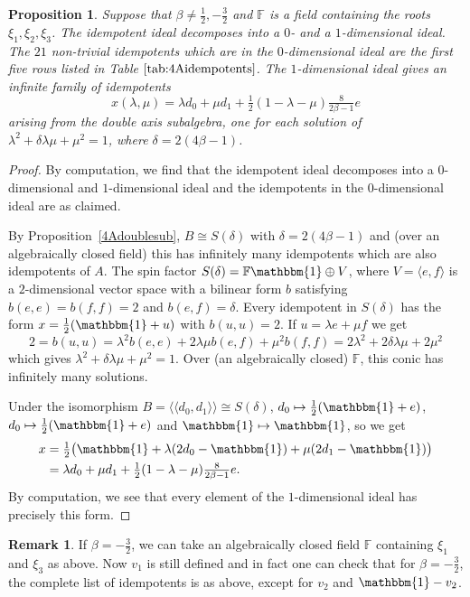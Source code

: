 \documentclass[11pt, a4paper]{article}
\theoremstyle{plain}
\newtheorem{proposition}[theorem]{Proposition}
\theoremstyle{definition}
\newtheorem{remark}[theorem]{Remark}
\newcommand\bt{\beta}
\newcommand\dl{\delta}
\newcommand\lm{\lambda}
\newcommand\la{\langle}
\newcommand\ra{\rangle}
\newcommand\lla{\langle\!\langle}
\newcommand\rra{\rangle\!\rangle}
\newcommand\FF{\mathbb{F}}
\newcommand{\0}{\overline{0}}
\newcommand{\2}{\overline{2}}
\newcommand{\1}{\mathbbm{1}}
\newcommand{\rt}{\xi}
\begin{document}
\begin{proposition}\label{4Aidems}
Suppose that $\bt \neq \frac{1}{2}, -\frac{3}{2}$ and $\FF$ is a field containing the roots $\rt_1, \rt_2, \rt_3$.  The idempotent ideal decomposes into a $0$- and a $1$-dimensional ideal.  The $21$ non-trivial idempotents which are in the $0$-dimensional ideal are the first five rows listed in Table $\ref{tab:4Aidempotents}$.  The $1$-dimensional ideal gives an infinite family of idempotents
\[
x(\lambda, \mu) = \lambda d_0 + \mu d_1 + \tfrac{1}{2}(1 - \lambda - \mu) \tfrac{8}{2\bt - 1}e
\]
arising from the double axis subalgebra, one for each solution of $\lambda^2 + \delta \lambda \mu + \mu^2 = 1$, where $\dl = 2(4\bt-1)$.
\end{proposition}
\begin{proof}
By computation, we find that the idempotent ideal decomposes into a $0$-dimensional and $1$-dimensional ideal and the idempotents in the $0$-dimensional ideal are as claimed.

By Proposition~\ref{4Adoublesub}, $B \cong S(\delta)$ with $\delta = 2(4\bt - 1)$ and (over an algebraically closed field) this has infinitely many idempotents which are also idempotents of $A$. The spin factor $S(\delta) = \FF \1 \oplus V$, where $V = \la e, f\ra$ is a $2$-dimensional vector space with a bilinear form $b$ satisfying $b(e,e) = b(f,f) = 2$ and $b(e,f) = \delta$. Every idempotent in $S(\delta)$ has the form $x = \tfrac{1}{2}(\1 + u)$ with $b(u,u) = 2$.  If $u = \lambda e + \mu f$ we get
\[
2 = b(u,u) = \lambda^2 b(e,e) + 2\lambda\mu b(e,f) + \mu^2 b(f,f) = 2\lambda^2 + 2\delta\lambda\mu + 2\mu^2
\]
which gives $\lambda^2 + \delta \lambda \mu + \mu^2 = 1$. Over (an algebraically closed) $\FF$, this conic has infinitely many solutions. 

Under the isomorphism $B = \lla d_0, d_1 \rra \cong S(\delta)$, $d_0 \mapsto \frac{1}{2}(\1+e)$, $d_0 \mapsto \frac{1}{2}(\1+e)$ and $\1 \mapsto \1$, so we get
\begin{align*}
x &=  \tfrac{1}{2}\big( \1 + \lm(2d_0-\1) + \mu(2d_1-\1) \big) \\
  &=  \lm d_0 + \mu d_1 +  \tfrac{1}{2}(1 - \lambda - \mu)\tfrac{8}{2\bt - 1}e.
\end{align*}
By computation, we see that every element of the $1$-dimensional ideal has precisely this form.
\end{proof}


\begin{remark}
	If $\bt = -\frac{3}{2}$, we can take an algebraically closed field $\FF$ containing $\rt_1$ and $\rt_3$ as above.  Now $v_1$ is still defined and in fact one can check that for $\bt = -\frac{3}{2}$, the complete list of idempotents is as above, except for $v_2$ and $\1-v_2$. 
\end{remark}
\end{document}

